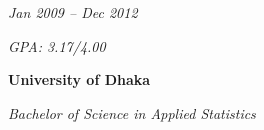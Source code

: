         \vspace{0.2 cm}
        
        \begin{twocolentry}{
            \textit{Jan 2009 – Dec 2012}
            
            \textit{GPA: 3.17/4.00}}
            \textbf{University of Dhaka}
        
            \textit{Bachelor of Science in Applied Statistics}
        \end{twocolentry}
        
